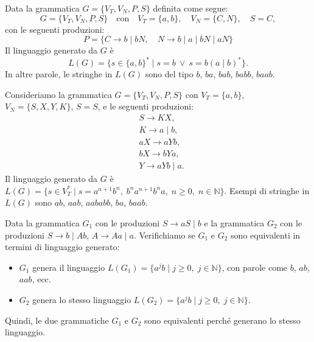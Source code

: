 \documentclass{article}
\begin{document}
\begin{example}
Data la grammatica \( G = \{V_T, V_N, P, S\} \) definita come segue:
\[
G = \{V_T, V_N, P, S \} \quad \text{con} \quad V_T = \{a, b\}, \quad V_N = \{C, N\}, \quad S = C,
\]
con le seguenti produzioni:
\[
P = \{C \rightarrow b \mid bN, \quad N \rightarrow b \mid a \mid bN \mid aN\}
\]
Il linguaggio generato da \( G \) è 
\[
L(G) = \{ s \in \{a, b\}^* \mid s = b \ \lor \ s = b(a \mid b)^* \}.
\]
In altre parole, le stringhe in \( L(G) \) sono del tipo \( b \), \( ba \), \( bab \), \( babb \), \( baab \).
\end{example}

\begin{example}
Consideriamo la grammatica \( G = \{V_T, V_N, P, S\} \) con \( V_T = \{a, b\} \), \( V_N = \{S, X, Y, K\} \), \( S = S \), e le seguenti produzioni:
\[
\begin{aligned}
    &S \rightarrow KX, \\
    &K \rightarrow a \mid b, \\
    &aX \rightarrow aYb, \\
    &bX \rightarrow bYa, \\
    &Y \rightarrow aYb \mid a.
\end{aligned}
\]
Il linguaggio generato da \( G \) è \( L(G) = \{s \in V_T^* \mid s = a^{n+1}b^n, \; b^na^{n+1}b^na, \; n \geq 0, \; n \in \mathbb{N}\} \).
Esempi di stringhe in \( L(G) \) sono \( ab \), \( aab \), \( aababb \), \( ba \), \( baab \).
\end{example}

\begin{example}
Data la grammatica \( G_1 \) con le produzioni \( S \rightarrow aS \mid b \) e la grammatica \( G_2 \) con le produzioni \( S \rightarrow b \mid Ab \), \( A \rightarrow Aa \mid a \).
\medskip
\noindent
Verifichiamo se \( G_1 \) e \( G_2 \) sono equivalenti in termini di linguaggio generato:

\begin{itemize}
    \item \( G_1 \) genera il linguaggio \( L(G_1) = \{a^j b \mid j \geq 0, \; j \in \mathbb{N}\} \), con parole come \( b \), \( ab \), \( aab \), ecc.
    \item \( G_2 \) genera lo stesso linguaggio \( L(G_2) = \{a^j b \mid j \geq 0, \; j \in \mathbb{N}\} \).
\end{itemize}

\noindent
Quindi, le due grammatiche \( G_1 \) e \( G_2 \) sono equivalenti perché generano lo stesso linguaggio.
\end{example}
\end{document}
